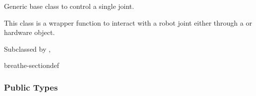 \documentclass[letterpaper,10pt,english]{sphinxmanual}
\begin{document}
\begin{fulllineitems}
\label{\detokenize{code/bioscara_hardware_drivers/index:_CPPv4N25bioscara_hardware_drivers25bioscara_hardware_drivers9BaseJointE}}\label{\detokenize{code/bioscara_hardware_drivers/index:_CPPv3N25bioscara_hardware_drivers25bioscara_hardware_drivers9BaseJointE}}\label{\detokenize{code/bioscara_hardware_drivers/index:_CPPv2N25bioscara_hardware_drivers25bioscara_hardware_drivers9BaseJointE}}\label{\detokenize{code/bioscara_hardware_drivers/index:bioscara_hardware_drivers::bioscara_hardware_drivers::BaseJoint}}
\pysigstartsignatures
\pysigstartmultiline
\pysigline
{\label{\detokenize{code/bioscara_hardware_drivers/index:classbioscara__hardware__drivers_1_1BaseJoint}}}
\pysigstopmultiline
\pysigstopsignatures{}
\sphinxAtStartPar
Generic base class to control a single joint. 

\sphinxAtStartPar
This class is a wrapper function to interact with a robot joint either through a {\hyperref[\detokenize{code/bioscara_hardware_drivers/index:classbioscara__hardware__drivers_1_1MockJoint}]{}} or hardware {\hyperref[\detokenize{code/bioscara_hardware_drivers/index:classbioscara__hardware__drivers_1_1Joint}]{}} object. 

\sphinxAtStartPar
Subclassed by {\hyperref[\detokenize{code/bioscara_hardware_drivers/index:classbioscara__hardware__drivers_1_1Joint}]{}}, {\hyperref[\detokenize{code/bioscara_hardware_drivers/index:classbioscara__hardware__drivers_1_1MockJoint}]{}}

\begin{sphinxuseclass}{breathe-sectiondef}\subsubsection*{Public Types}


\end{sphinxuseclass}
\end{fulllineitems}
\end{document}
